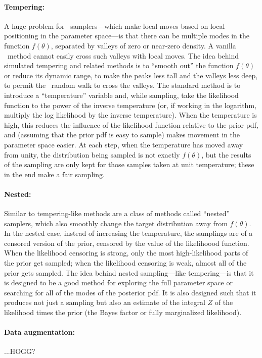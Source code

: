 \documentclass[12pt,twoside,pdftex]{article}
\newcommand{\MCMC}{\acronym{MCMC}}
\newcommand{\pars}{\theta}
\begin{document}
\paragraph{Tempering:}
A huge problem for \MCMC\ samplers---which make local moves based on
local positioning in the parameter space---is that there can be
multiple modes in the function $f(\pars)$, separated by valleys of
zero or near-zero density.
A vanilla \MCMC\ method cannot easily cross such valleys with local
moves.
The idea behind simulated tempering and related methods is to ``smooth
out'' the function $f(\pars)$ or reduce its dynamic range, to make the
peaks less tall and the valleys less deep, to permit the \MCMC\ random
walk to cross the valleys.
The standard method is to introduce a ``temperature'' variable and,
while sampling, take the likelihood function to the power of the
inverse temperature (or, if working in the logarithm, multiply the log
likelihood by the inverse temperature).
When the temperature is high, this reduces the influence of the
likelihood function relative to the prior pdf, and (assuming that the
prior pdf is easy to sample) makes movement in the parameter space
easier.
At each step, when the temperature has moved away from unity, the
distribution being sampled is not exactly $f(\pars)$, but the results
of the sampling are only kept for those samples taken at unit
temperature; these in the end make a fair sampling.

\paragraph{Nested:}
Similar to tempering-like methods are a class of methods called ``nested''
samplers, which also smoothly change the target distribution away from $f(\pars)$.
In the nested case, instead of increasing the temperature, the
samplings are of a censored version of the prior, censored by the
value of the likelihoood function.
When the likelihood censoring is strong, only the most high-likelihood
parts of the prior get sampled; when the likelihood censoring is weak,
almost all of the prior gets sampled.
The idea behind nested sampling---like tempering---is that it is
designed to be a good method for exploring the full parameter space or
searching for all of the modes of the posterior pdf.
It is also designed such that it produces not just a sampling but also
an estimate of the integral $Z$ of the likelihood times the prior
(the Bayes factor or fully marginalized likelihood).

\paragraph{Data augmentation:}
...HOGG?
\end{document}
